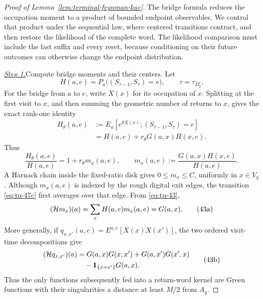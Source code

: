\begin{proof}[Proof of Lemma~\ref{lem:terminal-feynman-kac}]
The bridge formula reduces the occupation moment to a product of bounded
endpoint observables. We control that product under the sequential law,
where centered transitions contract, and then restore the likelihood of
the complete word. The likelihood comparison must include the last
suffix and every reset, because conditioning on their future outcomes
can otherwise change the endpoint distribution.

\smallskip\noindent
\underline{\textit{Step 1.}}\quad Compute bridge moments and their centers.
Let
\[
 H(a,e)=P_a\big((S_{\tau-1},S_\tau)=e\big),\qquad
 \tau=\tau_{D_y^c}.
\]
For the bridge from \(a\) to \(e\), write \(X(x)\) for its occupation of
\(x\).  Splitting at the first visit to \(x\), and then summing the
geometric number of returns to \(x\), gives the exact rank-one identity
\begin{equation}
\begin{split}
 H_\theta(a,e)
 &:=E_a[e^{\theta X(x)};(S_{\tau-1},S_\tau)=e]\\
 &=H(a,e)+r_\theta G(a,x)H(x,e).                              \end{split}
\tag{42}\label{eq:tu-42}
\end{equation}
Thus
\begin{equation}
       \frac{H_\theta(a,e)}{H(a,e)}
       =1+r_\theta m_x(a,e),\qquad
       m_x(a,e):=\frac{G(a,x)H(x,e)}{H(a,e)}.                 \tag{43}\label{eq:tu-43}
\end{equation}
A Harnack chain inside the fixed-ratio disk gives \(0\le m_x\le C\),
uniformly in \(x\in V_y\). Although \(m_x(a,e)\) is indexed by the
rough digital exit edges, the transition \eqref{eq:tu-47c} first averages over that
edge. From \eqref{eq:tu-43},
\begin{equation}
 ({\cal H}m_x)(a)=\sum_eH(a,e)m_x(a,e)=G(a,x).               \tag{43a}\label{eq:tu-43a}
\end{equation}
More generally, if \(q_{x,x'}(a,e)=E^{a,e}[X(x)X(x')]\), the
two ordered visit-time decompositions give
\begin{equation}
\begin{split}
 ({\cal H}q_{x,x'})(a)
 &=G(a,x)G(x,x')+G(a,x')G(x',x)\\
 &\quad-{\bf1}_{\{x=x'\}}G(a,x).                            \end{split}
\tag{43b}\label{eq:tu-43b}
\end{equation}
Thus the only functions subsequently fed into a return-word kernel are
Green functions with their singularities a distance at least \(M/2\)
from \(A_y\).


\end{proof}
